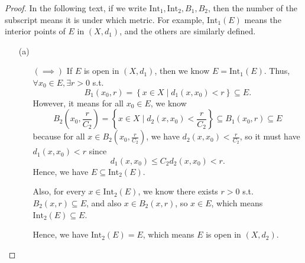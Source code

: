 \begin{proof}
In the following text, if we write \(\mathrm{Int}_1, \mathrm{Int}_2, B_1, B_2\), then the number of the subscript means it is under which metric. For example, \(\mathrm{Int}_1(E) \) means the interior points of \(E\) in \((X, d_1)\), and the others are similarly defined.    
  \begin{itemize}
    \item [(a)] \begin{itemize}
      \item [\((\implies )\)] If \(E\) is open in \((X, d_1)\), then we know \(E = \mathrm{Int}_1(E) \). Thus, \(\forall x_0 \in E, \exists r > 0\) s.t. 
      \[B_1(x_0, r) = \left\{ x \in X \mid d_1(x, x_0) < r \right\}  \subseteq E.\]
      However, it means for all \(x_0 \in E\), we know 
      \[
        B_2 \left( x_0, \frac{r}{C_2} \right) = \left\{ x \in X \mid d_2(x, x_0) < \frac{r}{C_2} \right\} \subseteq B_1(x_0, r) \subseteq  E
      \] because for all \(x \in B_2 \left( x_0, \frac{r}{C_2} \right) \), we have \(d_2(x, x_0) < \frac{r}{C_2}\), so it must have \(d_1(x, x_0) < r\) since 
      \[
        d_1(x, x_0) \le C_2 d_2(x,x_0) < r.
      \]   Hence, we have \(E \subseteq \mathrm{Int}_2(E)\).
      
      Also, for every \(x \in \mathrm{Int}_2(E) \), we know there exists \(r > 0\) s.t. \(B_2(x, r) \subseteq E\), and also \(x \in B_2(x, r)\), so \(x \in E\), which means \(\mathrm{Int}_2(E) \subseteq E \).  
      
      Hence, we have \(\mathrm{Int}_2(E) = E\), which means \(E\) is open in \((X, d_2)\).
      

\end{itemize}
\end{itemize}
\end{proof}
